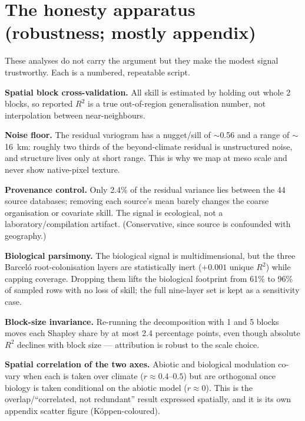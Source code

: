 \documentclass[11pt]{article}
\begin{document}
\section{The honesty apparatus (robustness; mostly appendix)}

These analyses do not carry the argument but they make the modest signal
trustworthy. Each is a numbered, repeatable script.

\textbf{Spatial block cross-validation.} All skill is estimated by holding out
whole 2\textdegree{} blocks, so reported $R^2$ is a true out-of-region
generalisation number, not interpolation between near-neighbours.

\textbf{Noise floor.} The residual variogram has a nugget/sill of $\sim$0.56 and a
range of $\sim$16~km: roughly two thirds of the beyond-climate residual is
unstructured noise, and structure lives only at short range. This is why we map
at meso scale and never show native-pixel texture.

\textbf{Provenance control.} Only 2.4\% of the residual variance lies between the
44 source databases; removing each source's mean barely changes the coarse
organisation or covariate skill. The signal is ecological, not a
laboratory/compilation artifact. (Conservative, since source is confounded with
geography.)

\textbf{Biological parsimony.} The biological signal is multidimensional, but the
three Barcel\'o root-colonisation layers are statistically inert ($+0.001$ unique
$R^2$) while capping coverage. Dropping them lifts the biological footprint from
61\% to 96\% of sampled rows with no loss of skill; the full nine-layer set is
kept as a sensitivity case.

\textbf{Block-size invariance.} Re-running the decomposition with 1\textdegree{}
and 5\textdegree{} blocks moves each Shapley share by at most 2.4 percentage
points, even though absolute $R^2$ declines with block size --- attribution is
robust to the scale choice.

\textbf{Spatial correlation of the two axes.} Abiotic and biological modulation
co-vary when each is taken over climate ($r\approx0.4$--$0.5$) but are orthogonal
once biology is taken conditional on the abiotic model ($r\approx0$). This is the
overlap/``correlated, not redundant'' result expressed spatially, and it is its
own appendix scatter figure (Köppen-coloured).

\end{document}
